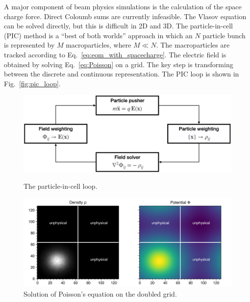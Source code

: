 A major component of beam physics simulations is the calculation of the space charge force. Direct Coloumb sums are currently infeasible. The Vlasov equation can be solved directly, but this is difficult in 2D and 3D. The particle-in-cell (PIC) method is a “best of both worlds” approach in which an $N$ particle bunch is represented by $M$ macroparticles, where $M \ll N$. The macroparticles are tracked according to Eq.~\eqref{eq:eom_with_spacecharge}. The electric field is obtained by solving Eq.~\eqref{eq:Poisson} on a grid. The key step is transforming between the discrete and continuous representation. The PIC loop is shown in Fig.~\ref{fig:pic_loop}. 
%
\begin{figure}[!p]
    \centering
    \includegraphics[width=\textwidth]{Images/chapter3/pic_loop.png}
    \caption{\label{fig:pic_loop}The particle-in-cell loop.}
    \vfill
    \vspace*{2.5cm}
    \vfill
    \includegraphics[width=\textwidth]{Images/chapter3/poisson.png}
    \caption{\label{fig:poisson}Solution of Poisson's equation on the doubled grid.}
    
\end{figure}
%

